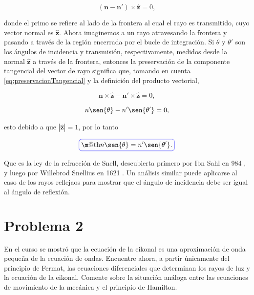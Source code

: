 \documentclass[a4paper,10pt]{article}
\makeatletter
\numberwithin{equation}{section}
\newcommand*{\boxcolor}{blue}
\renewcommand{\boxed}[1]{\textcolor{\boxcolor}{%
\tikz[baseline={([yshift=-1ex]current bounding box.center)}] \node [rectangle, minimum width=1ex,rounded corners,draw] {\normalcolor\m@th$\displaystyle#1$};}}
\makeatother
\begin{document}
\begin{equation}
 (\mathbf{n} - \mathbf{n}') \times \hat{\mathbf{z}} = 0,
 \label{eq:preservacionTangencial}
\end{equation}

donde el primo se refiere al lado de la frontera al cual el rayo es transmitido, 
cuyo vector normal es $\hat{\mathbf{z}}$. Ahora imaginemos a un rayo atravesando 
la frontera y pasando a través de la región encerrada por el bucle de integración. 
Si $\theta$ y $\theta'$ son los ángulos de incidencia y transmisión, respectivamente, 
medidos desde la normal $\hat{\mathbf{z}}$ a través de la frontera, entonces la 
preservación de la componente tangencial del vector de rayo significa que, 
tomando en cuenta \eqref{eq:preservacionTangencial} y la definición del 
producto vectorial,

\begin{equation}
 \mathbf{n} \times \hat{\mathbf{z}} - \mathbf{n}' \times \hat{\mathbf{z}} = 0,
\end{equation}

\begin{equation}
 n\sen{\theta} - n'\sen{\theta'} = 0,
\end{equation}

esto debido a que $|\hat{\mathbf{z}}| = 1$, por lo tanto 

\begin{equation}
 \boxed{n\sen{\theta} = n'\sen{\theta'}.}
\end{equation}

Que es la ley de la refracción de Snell, descubierta primero por Ibn Sahl en 984 \cite{rashed}, 
y luego por Willebrod Snellius en 1621 \cite{holm}. Un análisis similar puede aplicarse al 
caso de los rayos reflejaos para mostrar que el ángulo de incidencia debe ser igual 
al ángulo de reflexión.

\section{Problema 2}

En el curso se mostró que la ecuación de la eikonal es una aproximación de onda 
pequeña de la ecuación de ondas. Encuentre ahora, a partir únicamente del principio 
de Fermat, las ecuaciones diferenciales que determinan los rayos de luz y la ecuación 
de la eikonal. Comente sobre la situación análoga entre las ecuaciones de movimiento 
de la mecánica y el principio de Hamilton.

\vspace{.3cm}
\end{document}
